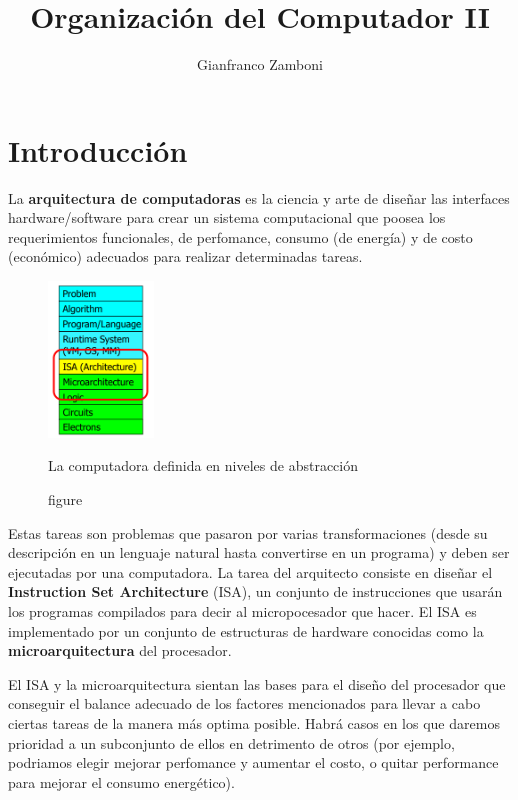 

\title{Organización del Computador II}
\author{Gianfranco Zamboni}



\newcommand{\red}[1]{{\color{red}#1}}  			%

	\maketitle
	\tableofcontents

\newpage
\section{Introducción}

La \textbf{arquitectura de computadoras} es la ciencia y arte de diseñar las interfaces hardware/software para crear un sistema computacional que poosea los requerimientos funcionales, de perfomance, consumo (de energía) y de costo (económico) adecuados para realizar determinadas tareas.

\begin{figure}
	\centering
	\includegraphics[width=0.25\textwidth]{imagenes/arquitectura}
	\caption{figure}{La computadora definida en niveles de abstracción}
	\label{fig:intro::arquitectura}
\end{figure}

Estas tareas son problemas que pasaron por varias transformaciones (desde su descripción en un lenguaje natural hasta convertirse en un programa) y deben ser ejecutadas por una computadora. La tarea del arquitecto consiste en diseñar el \textbf{Instruction Set Architecture} (ISA), un conjunto de instrucciones que usarán los programas compilados para decir al micropocesador que hacer. El ISA es implementado por un conjunto de estructuras de hardware conocidas como la \textbf{microarquitectura} del procesador.

El ISA y la microarquitectura sientan las bases para el diseño del procesador que conseguir el balance adecuado de los factores mencionados para llevar a cabo ciertas tareas de la manera más optima posible. Habrá casos en los que daremos prioridad a un subconjunto de ellos en detrimento de otros (por ejemplo, podriamos elegir mejorar perfomance y aumentar el costo, o quitar performance para mejorar el consumo energético).

